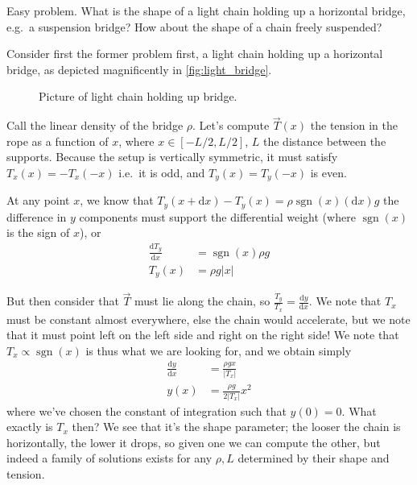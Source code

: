 \documentclass[12pt]{report}
\newcommand*{\rd}[2]{\frac{\mathrm{d}#1}{\mathrm{d}#2}}
\newcommand*{\abs}[1]{\left|#1\right|}
\DeclareMathOperator{\sgn}{sgn}
\begin{document}
Easy problem. What is the shape of a light chain holding up a horizontal bridge,
e.g.\ a suspension bridge? How about the shape of a chain freely suspended?

Consider first the former problem first, a light chain holding up a horizontal
bridge, as depicted magnificently in \autoref{fig:light_bridge}.
\begin{figure}[!h]
    \centering
    \caption{Picture of light chain holding up bridge.\label{fig:light_bridge}}
\end{figure}

Call the linear density of the bridge $\rho$. Let's compute $\vec{T}(x)$
the tension in the rope as a function of $x$, where $x \in [-L/2,L/2]$, $L$ the
distance between the supports. Because the setup is vertically symmetric, it
must satisfy $T_x(x) = -T_x(-x)$ i.e.\ it is odd, and $T_y(x) = T_y(-x)$ is
even.

At any point $x$, we know that $T_y(x + \mathrm{d}x) - T_y(x) = \rho \sgn(x)
(\mathrm{d}x)g$ the difference in $y$ components must support the differential
weight (where $\sgn(x)$ is the sign of $x$), or
\begin{align*}
    \rd{T_y}{x} &= \sgn(x)\rho g\\
    T_y(x) &= \rho g \abs{x}
\end{align*}

But then consider that $\vec{T}$ must lie along the chain, so $\frac{T_y}{T_x} =
\rd{y}{x}$. We note that $T_x$ must be constant almost everywhere, else the
chain would accelerate, but we note that it must point left on the left side and
right on the right side! We note that $T_x \propto \sgn(x)$ is thus what we are
looking for, and we obtain simply
\begin{align}
    \rd{y}{x} &= \frac{\rho g x}{\abs{T_x}} \nonumber\\
    y(x) &= \frac{\rho g}{2\abs{T_x}}x^2\label{eq:bridge_curve}
\end{align}
where we've chosen the constant of integration such that $y(0) = 0$. What
exactly is $T_x$ then? We see that it's the shape parameter; the looser the
chain is horizontally, the lower it drops, so given one we can compute the
other, but indeed a family of solutions exists for any $\rho, L$ determined by
their shape and tension.
\end{document}

